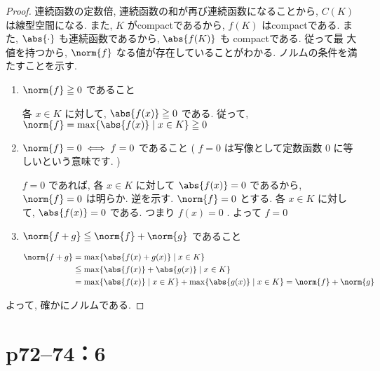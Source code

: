 \documentclass[a4paper,10pt,fleqn]{ltjsarticle}
\begin{document}
\begin{leftbar}
    \begin{proof}
        連続函数の定数倍, 連続函数の和が再び連続函数になることから, $C ( K )$ は線型空間になる. また, $K$ がcompactであるから, $f ( K )$ はcompactである. また, $\abs{ \cdot }$ も連続函数であるから, $\abs{ f ( K ) }$ も compactである. 従って最
        大値を持つから, $\norm{ f }$ なる値が存在していることがわかる. ノルムの条件を満たすことを示す.
        \begin{enumerate}
            \item $\norm{ f } \geq 0$ であること

                  \zw 各 $x \in K$ に対して, $\abs{f ( x ) } \geq 0$ である. 従って, $\norm{ f } = \max \{ \abs{ f ( x )} \mid x \in K \} \geq 0$

            \item $\norm{ f } = 0 \iff  f = 0$ であること ( $f = 0$ は写像として定数函数 $0$ に等しいという意味です. )

                  $f = 0$ であれば, 各 $x \in K$ に対して $\abs{ f ( x ) } = 0$ であるから, $\norm{ f } = 0$ は明らか. 逆を示す. $\norm{ f } = 0$ とする. 各 $x \in K$ に対して, $\abs{ f ( x ) } = 0$ である. つまり $f ( x ) = 0$ . よって $f = 0$

            \item $\norm{ f + g } \leq \norm{ f } + \norm{ g }$ であること

                  \begin{align*}
                      \norm{ f + g } & =  \max \{ \abs{ f ( x ) + g ( x )} \mid x \in K \}                                                              \\
                                     & \leq  \max \{ \abs{ f ( x ) } + \abs{ g ( x ) } \mid x \in K \}                                                  \\
                                     & =  \max \{ \abs{ f ( x ) }  \mid x \in K \} + \max \{ \abs{ g ( x ) }  \mid x \in K \} = \norm{ f } + \norm{ g }
                  \end{align*}
        \end{enumerate}
        よって, 確かにノルムである.
    \end{proof}
\end{leftbar}
\newpage

\section*{p72--74：6}
\end{document}
